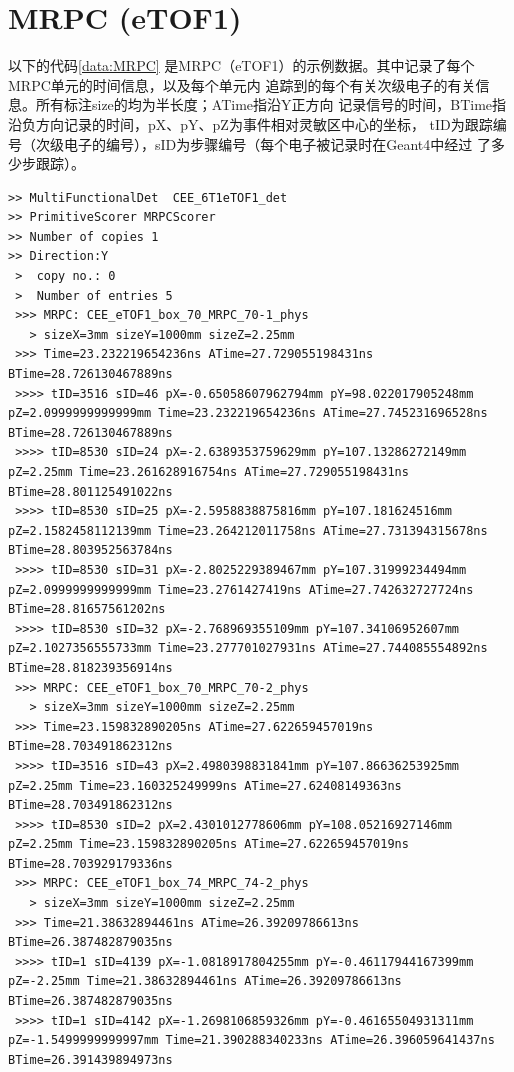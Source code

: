 \documentclass[bachelor,openany,oneside,color]{buaathesis}
\begin{document}
\section{MRPC (eTOF1)}\label{sec:data:MRPC}
以下的代码\ref{data:MRPC}
是MRPC（eTOF1）的示例数据。其中记录了每个MRPC单元的时间信息，以及每个单元内
追踪到的每个有关次级电子的有关信息。所有标注size的均为半长度；ATime指沿Y正方向
记录信号的时间，BTime指沿负方向记录的时间，pX、pY、pZ为事件相对灵敏区中心的坐标，
tID为跟踪编号（次级电子的编号），sID为步骤编号（每个电子被记录时在Geant4中经过
了多少步跟踪）。
\begin{lstlisting}[caption={eTOF1:MRPC},label={data:MRPC},firstnumber=4397,lastline=4453]
>> MultiFunctionalDet  CEE_6T1eTOF1_det
>> PrimitiveScorer MRPCScorer
>> Number of copies 1
>> Direction:Y
 >  copy no.: 0
 >  Number of entries 5
 >>> MRPC: CEE_eTOF1_box_70_MRPC_70-1_phys
   > sizeX=3mm sizeY=1000mm sizeZ=2.25mm 
 >>> Time=23.232219654236ns ATime=27.729055198431ns BTime=28.726130467889ns
 >>>> tID=3516 sID=46 pX=-0.65058607962794mm pY=98.022017905248mm pZ=2.0999999999999mm Time=23.232219654236ns ATime=27.745231696528ns BTime=28.726130467889ns
 >>>> tID=8530 sID=24 pX=-2.6389353759629mm pY=107.13286272149mm pZ=2.25mm Time=23.261628916754ns ATime=27.729055198431ns BTime=28.801125491022ns
 >>>> tID=8530 sID=25 pX=-2.5958838875816mm pY=107.181624516mm pZ=2.1582458112139mm Time=23.264212011758ns ATime=27.731394315678ns BTime=28.803952563784ns
 >>>> tID=8530 sID=31 pX=-2.8025229389467mm pY=107.31999234494mm pZ=2.0999999999999mm Time=23.2761427419ns ATime=27.742632727724ns BTime=28.81657561202ns
 >>>> tID=8530 sID=32 pX=-2.768969355109mm pY=107.34106952607mm pZ=2.1027356555733mm Time=23.277701027931ns ATime=27.744085554892ns BTime=28.818239356914ns
 >>> MRPC: CEE_eTOF1_box_70_MRPC_70-2_phys
   > sizeX=3mm sizeY=1000mm sizeZ=2.25mm 
 >>> Time=23.159832890205ns ATime=27.622659457019ns BTime=28.703491862312ns
 >>>> tID=3516 sID=43 pX=2.4980398831841mm pY=107.86636253925mm pZ=2.25mm Time=23.160325249999ns ATime=27.62408149363ns BTime=28.703491862312ns
 >>>> tID=8530 sID=2 pX=2.4301012778606mm pY=108.05216927146mm pZ=2.25mm Time=23.159832890205ns ATime=27.622659457019ns BTime=28.703929179336ns
 >>> MRPC: CEE_eTOF1_box_74_MRPC_74-2_phys
   > sizeX=3mm sizeY=1000mm sizeZ=2.25mm 
 >>> Time=21.38632894461ns ATime=26.39209786613ns BTime=26.387482879035ns
 >>>> tID=1 sID=4139 pX=-1.0818917804255mm pY=-0.46117944167399mm pZ=-2.25mm Time=21.38632894461ns ATime=26.39209786613ns BTime=26.387482879035ns
 >>>> tID=1 sID=4142 pX=-1.2698106859326mm pY=-0.46165504931311mm pZ=-1.5499999999997mm Time=21.390288340233ns ATime=26.396059641437ns BTime=26.391439894973ns

\end{lstlisting}
\end{document}
